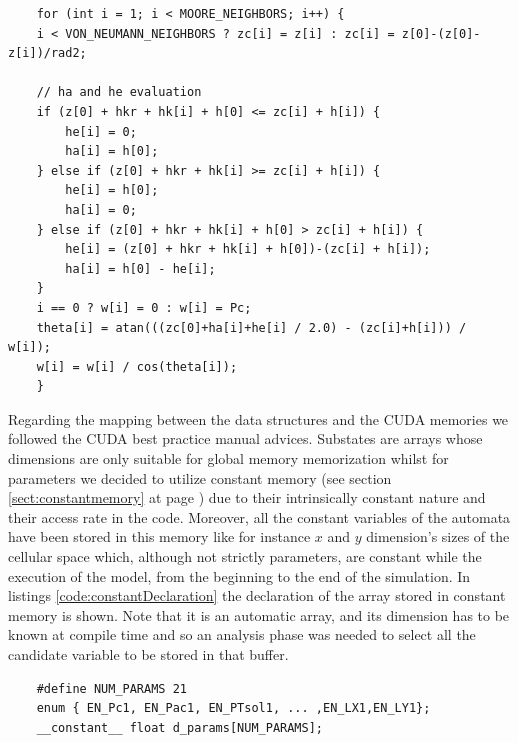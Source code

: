 \begin{lstlisting}
    for (int i = 1; i < MOORE_NEIGHBORS; i++) {
	i < VON_NEUMANN_NEIGHBORS ? zc[i] = z[i] : zc[i] = z[0]-(z[0]-z[i])/rad2;

	// ha and he evaluation
	if (z[0] + hkr + hk[i] + h[0] <= zc[i] + h[i]) {
		he[i] = 0;
		ha[i] = h[0];
	} else if (z[0] + hkr + hk[i] >= zc[i] + h[i]) {
		he[i] = h[0];
		ha[i] = 0;
	} else if (z[0] + hkr + hk[i] + h[0] > zc[i] + h[i]) {
		he[i] = (z[0] + hkr + hk[i] + h[0])-(zc[i] + h[i]);
		ha[i] = h[0] - he[i];
	}
	i == 0 ? w[i] = 0 : w[i] = Pc;
	theta[i] = atan(((zc[0]+ha[i]+he[i] / 2.0) - (zc[i]+h[i])) / w[i]);
	w[i] = w[i] / cos(theta[i]);
	}

\end{lstlisting}

Regarding the mapping between the data structures and the CUDA memories we
followed the CUDA best practice manual\cite{CUDACBESTPRACTICE} advices.
Substates are arrays whose dimensions are only suitable for global memory
memorization whilst for parameters we decided to utilize constant memory (see
section \ref{sect:constantmemory} at page \pageref{sect:constantmemory}) due to
their intrinsically constant nature and their access rate in the code.
Moreover, all the constant variables of the automata have been stored in this
memory like for instance \(x\) and \(y\) dimension's sizes of the cellular space
which, although not strictly parameters, are constant while
the execution of the model, from the beginning to the end of the simulation. In listings
\ref{code:constantDeclaration} the declaration of the array stored in constant
memory is shown.
Note that it is an automatic array, and its dimension has to be known at compile
time and so an analysis phase was needed to select all the candidate variable to
be stored in that buffer.

\begin{lstlisting}
	#define NUM_PARAMS 21
	enum { EN_Pc1, EN_Pac1, EN_PTsol1, ... ,EN_LX1,EN_LY1};	
	__constant__ float d_params[NUM_PARAMS];

\end{lstlisting}


